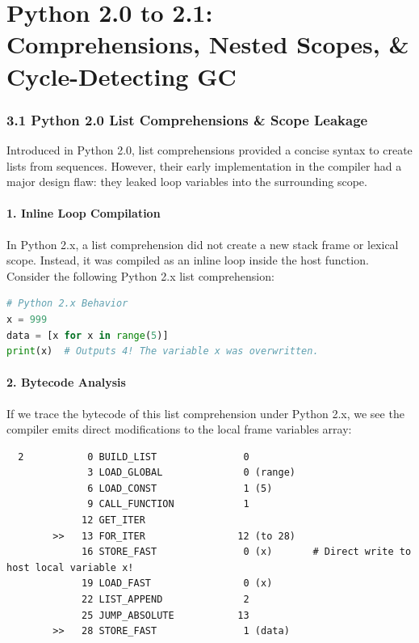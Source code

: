 \hypertarget{python-2.0-to-2.1-comprehensions-nested-scopes-cycle-detecting-gc}{%
\chapter{Python 2.0 to 2.1: Comprehensions, Nested Scopes, \&
Cycle-Detecting
GC}\label{python-2.0-to-2.1-comprehensions-nested-scopes-cycle-detecting-gc}}

\hypertarget{python-2.0-list-comprehensions-scope-leakage}{%
\subsection{3.1 Python 2.0 List Comprehensions \& Scope
Leakage}\label{python-2.0-list-comprehensions-scope-leakage}}

Introduced in Python 2.0, list comprehensions provided a concise syntax
to create lists from sequences. However, their early implementation in
the compiler had a major design flaw: they leaked loop variables into
the surrounding scope.

\hypertarget{inline-loop-compilation}{%
\subsubsection{1. Inline Loop
Compilation}\label{inline-loop-compilation}}

In Python 2.x, a list comprehension did not create a new stack frame or
lexical scope. Instead, it was compiled as an inline loop inside the
host function. Consider the following Python 2.x list comprehension:

\begin{lstlisting}[language=Python]
# Python 2.x Behavior
x = 999
data = [x for x in range(5)]
print(x)  # Outputs 4! The variable x was overwritten.
\end{lstlisting}

\hypertarget{bytecode-analysis}{%
\subsubsection{2. Bytecode Analysis}\label{bytecode-analysis}}

If we trace the bytecode of this list comprehension under Python 2.x, we
see the compiler emits direct modifications to the local frame variables
array:

\begin{lstlisting}
  2           0 BUILD_LIST               0
              3 LOAD_GLOBAL              0 (range)
              6 LOAD_CONST               1 (5)
              9 CALL_FUNCTION            1
             12 GET_ITER
        >>   13 FOR_ITER                12 (to 28)
             16 STORE_FAST               0 (x)       # Direct write to host local variable x!
             19 LOAD_FAST                0 (x)
             22 LIST_APPEND              2
             25 JUMP_ABSOLUTE           13
        >>   28 STORE_FAST               1 (data)
\end{lstlisting}

